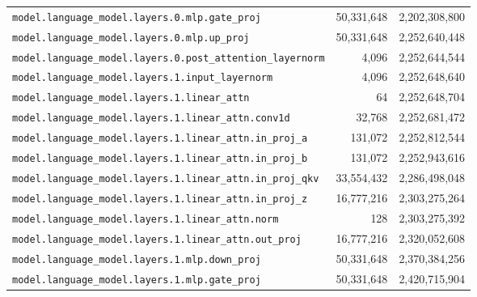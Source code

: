 \documentclass[10pt,a4paper]{article}
\theoremstyle{definition}
\begin{document}
\begin{appendices}
\begin{longtable}{p{9.5cm}rr}
\texttt{model.\allowbreak{}language\_model.\allowbreak{}layers.\allowbreak{}0.\allowbreak{}mlp.\allowbreak{}gate\_proj} & 50,331,648 & 2,202,308,800 \\
\texttt{model.\allowbreak{}language\_model.\allowbreak{}layers.\allowbreak{}0.\allowbreak{}mlp.\allowbreak{}up\_proj} & 50,331,648 & 2,252,640,448 \\
\texttt{model.\allowbreak{}language\_model.\allowbreak{}layers.\allowbreak{}0.\allowbreak{}post\_attention\_layernorm} & 4,096 & 2,252,644,544 \\
\texttt{model.\allowbreak{}language\_model.\allowbreak{}layers.\allowbreak{}1.\allowbreak{}input\_layernorm} & 4,096 & 2,252,648,640 \\
\texttt{model.\allowbreak{}language\_model.\allowbreak{}layers.\allowbreak{}1.\allowbreak{}linear\_attn} & 64 & 2,252,648,704 \\
\texttt{model.\allowbreak{}language\_model.\allowbreak{}layers.\allowbreak{}1.\allowbreak{}linear\_attn.\allowbreak{}conv1d} & 32,768 & 2,252,681,472 \\
\texttt{model.\allowbreak{}language\_model.\allowbreak{}layers.\allowbreak{}1.\allowbreak{}linear\_attn.\allowbreak{}in\_proj\_a} & 131,072 & 2,252,812,544 \\
\texttt{model.\allowbreak{}language\_model.\allowbreak{}layers.\allowbreak{}1.\allowbreak{}linear\_attn.\allowbreak{}in\_proj\_b} & 131,072 & 2,252,943,616 \\
\texttt{model.\allowbreak{}language\_model.\allowbreak{}layers.\allowbreak{}1.\allowbreak{}linear\_attn.\allowbreak{}in\_proj\_qkv} & 33,554,432 & 2,286,498,048 \\
\texttt{model.\allowbreak{}language\_model.\allowbreak{}layers.\allowbreak{}1.\allowbreak{}linear\_attn.\allowbreak{}in\_proj\_z} & 16,777,216 & 2,303,275,264 \\
\texttt{model.\allowbreak{}language\_model.\allowbreak{}layers.\allowbreak{}1.\allowbreak{}linear\_attn.\allowbreak{}norm} & 128 & 2,303,275,392 \\
\texttt{model.\allowbreak{}language\_model.\allowbreak{}layers.\allowbreak{}1.\allowbreak{}linear\_attn.\allowbreak{}out\_proj} & 16,777,216 & 2,320,052,608 \\
\texttt{model.\allowbreak{}language\_model.\allowbreak{}layers.\allowbreak{}1.\allowbreak{}mlp.\allowbreak{}down\_proj} & 50,331,648 & 2,370,384,256 \\
\texttt{model.\allowbreak{}language\_model.\allowbreak{}layers.\allowbreak{}1.\allowbreak{}mlp.\allowbreak{}gate\_proj} & 50,331,648 & 2,420,715,904 \\

\end{longtable}
\end{appendices}
\end{document}
